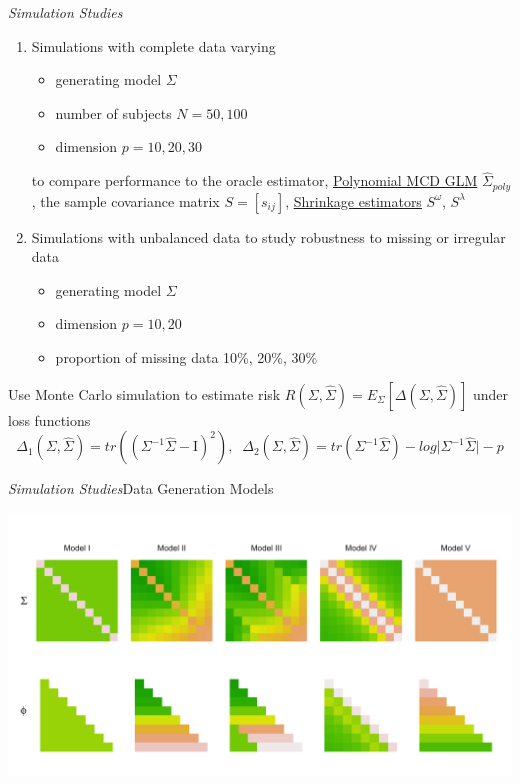 \begin{frame}{\emph{Simulation Studies}}\label{simulation-studies-benchmark-estimators}
\footnotesize
\begin{enumerate}
\item Simulations with complete data varying 
	\begin{itemize}
	\item generating model $\Sigma$
	\item number of subjects $N = 50, 100$
	\item dimension $p = 10, 20, 30$
	\end{itemize}
to compare performance to the oracle estimator, \hyperlink{polynomial-mcd-model}{Polynomial MCD GLM} $\hat{\Sigma}_{poly}$, the sample covariance matrix $S = \left[s_{ij}\right]$, \hyperlink{shrinkage-estimators}{Shrinkage estimators} $S^\omega$, $S^\lambda$
\item Simulations with unbalanced data to study robustness to missing or irregular data
		\begin{itemize}
	\item generating model $\Sigma$
	\item dimension $p = 10, 20$
	\item proportion of missing data 10\%, 20\%, 30\%
	\end{itemize}
\end{enumerate}

\footnotesize
Use Monte Carlo simulation to estimate risk $R \left(\Sigma,\hat{\Sigma}\right) = E_\Sigma\left[\Delta\left(\Sigma,\hat{\Sigma}\right)\right]$ under loss functions	
	\[
	\Delta_1\left(\Sigma,\hat{\Sigma} \right) = tr\left(\left( \Sigma^{-1} \hat{\Sigma} - \mathrm{I}\right)^2 \right),\;\;	\Delta_2\left(\Sigma,\hat{\Sigma}\right) = tr\left( \Sigma^{-1} \hat{\Sigma} \right) - log \vert \Sigma^{-1} \hat{\Sigma} \vert - p
	\]

\end{frame}


\begin{frame}[c]{\emph{Simulation Studies}}{Data Generation Models}

\begin{center}
  \includegraphics[width = \textwidth]{img/chapter-4/cov-cholesky-grid-beamer}%
\end{center}
\end{frame}

